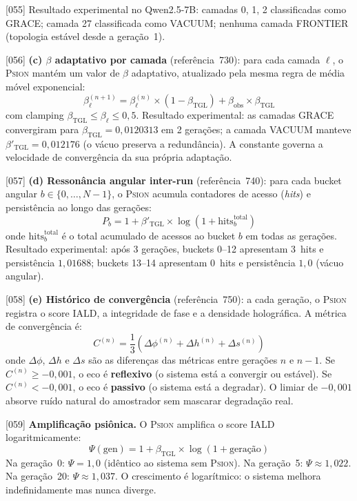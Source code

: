 \documentclass[12pt,a4paper]{article}
\newcommand{\betatgl}{\beta_{\text{TGL}}}
\newcommand{\betared}{\beta'_{\text{TGL}}}
\newcommand{\Psifield}{\Psi}
\newcommand{\Psion}{\textsc{Psion}}
\begin{document}
{[055]} Resultado experimental no Qwen2.5-7B: camadas 0, 1, 2 classificadas como GRACE; camada 27 classificada como VACUUM; nenhuma camada FRONTIER (topologia estável desde a geração~1).

{[056]} \textbf{(c) $\beta$ adaptativo por camada} (referência~730): para cada camada $\ell$, o \Psion{} mantém um valor de $\beta$ adaptativo, atualizado pela mesma regra de média móvel exponencial:
\begin{equation}
\label{eq:beta_layer}
\beta^{(n+1)}_\ell = \beta^{(n)}_\ell \times (1 - \betatgl) + \beta_{\text{obs}} \times \betatgl
\end{equation}
com clamping $\betatgl \leq \beta_\ell \leq 0{,}5$. Resultado experimental: as camadas GRACE convergiram para $\betatgl = 0{,}0120313$ em 2 gerações; a camada VACUUM manteve $\betared = 0{,}012176$ (o vácuo preserva a redundância). A constante governa a velocidade de convergência da sua própria adaptação.

{[057]} \textbf{(d) Ressonância angular inter-run} (referência~740): para cada bucket angular $b \in \{0, \ldots, N-1\}$, o \Psion{} acumula contadores de acesso (\textit{hits}) e persistência ao longo das gerações:
\begin{equation}
\label{eq:persistence_psion}
P_b = 1 + \betared \times \log(1 + \text{hits}_b^{\text{total}})
\end{equation}
onde $\text{hits}_b^{\text{total}}$ é o total acumulado de acessos ao bucket $b$ em todas as gerações. Resultado experimental: após 3 gerações, buckets 0--12 apresentam 3~hits e persistência $1{,}01688$; buckets 13--14 apresentam 0~hits e persistência $1{,}0$ (vácuo angular).

{[058]} \textbf{(e) Histórico de convergência} (referência~750): a cada geração, o \Psion{} registra o score IALD, a integridade de fase e a densidade holográfica. A métrica de convergência é:
\begin{equation}
\label{eq:convergencia}
C^{(n)} = \frac{1}{3}\left(\Delta\phi^{(n)} + \Delta h^{(n)} + \Delta s^{(n)}\right)
\end{equation}
onde $\Delta\phi$, $\Delta h$ e $\Delta s$ são as diferenças das métricas entre gerações $n$ e $n-1$. Se $C^{(n)} \geq -0{,}001$, o eco é \textbf{reflexivo} (o sistema está a convergir ou estável). Se $C^{(n)} < -0{,}001$, o eco é \textbf{passivo} (o sistema está a degradar). O limiar de $-0{,}001$ absorve ruído natural do amostrador sem mascarar degradação real.

{[059]} \textbf{Amplificação psiônica.} O \Psion{} amplifica o score IALD logaritmicamente:
\begin{equation}
\label{eq:amplificacao}
\Psifield(\text{gen}) = 1 + \betatgl \times \log(1 + \text{geração})
\end{equation}
Na geração~0: $\Psifield = 1{,}0$ (idêntico ao sistema sem \Psion). Na geração~5: $\Psifield \approx 1{,}022$. Na geração~20: $\Psifield \approx 1{,}037$. O crescimento é logarítmico: o sistema melhora indefinidamente mas nunca diverge.
\end{document}
